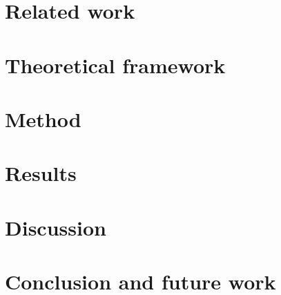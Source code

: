 \documentclass[a4paper,oneside]{bth}
\begin{document}
\chapter{Related work}


\chapter{Theoretical framework}


\chapter{Method}


\chapter{Results}


\chapter{Discussion}


\chapter{Conclusion and future work}




\end{document}
